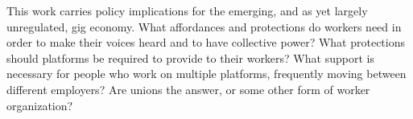 \documentclass{article}
\begin{document}
This work carries policy implications for the emerging, and as yet largely unregulated, gig economy.
What affordances and protections do workers need in order to make their voices heard and to have collective power?
What protections should platforms be required to provide to their workers?
What support is necessary for people who work on multiple platforms, frequently moving between different employers?
Are unions the answer, or some other form of worker organization?


\end{document}
